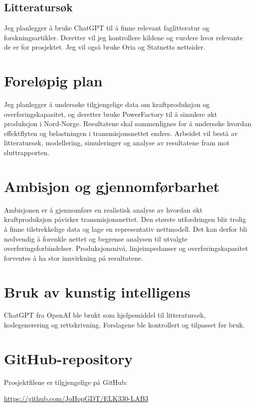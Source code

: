 \documentclass[12pt,a4paper]{article}
\begin{document}
\subsection{Litteratursøk}

Jeg planlegger å bruke ChatGPT til å finne relevant faglitteratur
og forskningsartikler. Deretter vil jeg kontrollere kildene og
vurdere hvor relevante de er for prosjektet. Jeg vil også bruke
Oria og Statnetts nettsider.


\section{Foreløpig plan}

Jeg planlegger å undersøke tilgjengelige data om kraftproduksjon
og overføringskapasitet, og deretter bruke PowerFactory til å
simulere økt produksjon i Nord-Norge. Resultatene skal sammenlignes
for å undersøke hvordan effektflyten og belastningen i
transmisjonsnettet endres. Arbeidet vil bestå av litteratursøk,
modellering, simuleringer og analyse av resultatene fram mot
sluttrapporten.


\section{Ambisjon og gjennomførbarhet}

Ambisjonen er å gjennomføre en realistisk analyse av hvordan
økt kraftproduksjon påvirker transmisjonsnettet. Den største
utfordringen blir trolig å finne tilstrekkelige data og lage
en representativ nettmodell. Det kan derfor bli nødvendig
å forenkle nettet og begrense analysen til utvalgte
overføringsforbindelser. Produksjonsnivå, linjeimpedanser
og overføringskapasitet forventes å ha stor innvirkning
på resultatene.



\section{Bruk av kunstig intelligens}

ChatGPT fra OpenAI ble brukt som hjelpemiddel til litteratursøk,
kodegenerering og rettskrivning. Forslagene ble kontrollert
og tilpasset før bruk.

\section{GitHub-repository}

Prosjektfilene er tilgjengelige på GitHub:

\url{https://github.com/JoHopGDT/ELK330-LAB3}
\vspace{30mm}


\end{document}
